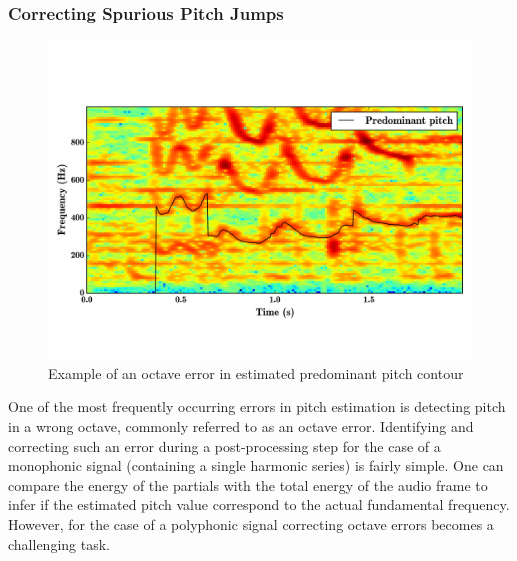 {\subsubsection{Correcting Spurious Pitch Jumps}
\label{sec:data_processing_correcting_pitch_jumps}

\begin{figure}
	\begin{center}
		\includegraphics[width=\figSizeHundred]{ch05_preprocessing/figures/octaveErrorIllustration.png}
	\end{center}
	\caption{Example of an octave error in estimated predominant pitch contour}
	\label{fig:octave_error_pitch}
\end{figure}

One of the most frequently occurring errors in pitch estimation is detecting pitch in a wrong octave, commonly referred to as an octave error. Identifying and correcting such an error during a post-processing step for the case of a monophonic signal (containing a single harmonic series) is fairly simple. One can compare the energy of the partials with the total energy of the audio frame to infer if the estimated pitch value correspond to the actual fundamental frequency. However, for the case of a polyphonic signal correcting octave errors becomes a challenging task. 

}
